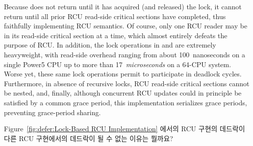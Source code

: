 Because  does not return until it has acquired
(and released) the lock, it cannot return until all prior RCU read-side
critical sections have completed, thus faithfully implementing
RCU semantics.
Of course, only one RCU reader may be in its read-side critical section
at a time, which almost entirely defeats the purpose of RCU.
In addition, the lock operations in  and
 are extremely heavyweight,
with read-side overhead ranging from about 100~nanoseconds on a single Power5
CPU up to more than 17~\emph{microseconds} on a 64-CPU system.
Worse yet,
these same lock operations permit 
to participate in deadlock cycles.
Furthermore, in absence of recursive locks,
RCU read-side critical sections cannot be nested, and, finally,
although concurrent RCU updates could in principle be satisfied by
a common grace period, this implementation serializes grace periods,
preventing grace-period sharing.
\fi

\QuickQuiz{}
	Figure~\ref{fig:defer:Lock-Based RCU Implementation} 에서의 RCU 구현의
	데드락이 다른 RCU 구현에서의 데드락이 될 수 없는 이유는 뭘까요?
	\iffalse

